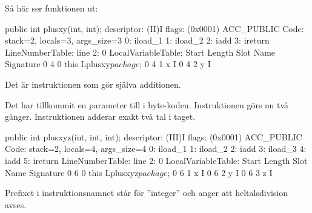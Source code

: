 \SubtaskSolved Så här ser funktionen  ut:
\begin{REPL}
public int plusxy(int, int);
  descriptor: (II)I
  flags: (0x0001) ACC_PUBLIC
  Code:
    stack=2, locals=3, args_size=3
       0: iload_1
       1: iload_2
       2: iadd
       3: ireturn
    LineNumberTable:
      line 2: 0
    LocalVariableTable:
      Start  Length  Slot  Name   Signature
          0       4     0  this   Lplusxy$package$;
          0       4     1     x   I
          0       4     2     y   I
\end{REPL}
Det är instruktionen  som gör själva additionen.


\SubtaskSolved Det har tillkommit en parameter till i byte-koden. Instruktionen  görs nu två gånger. Instruktionen  adderar exakt två tal i taget.

\begin{REPL}
public int plusxyz(int, int, int);
  descriptor: (III)I
  flags: (0x0001) ACC_PUBLIC
  Code:
    stack=2, locals=4, args_size=4
       0: iload_1
       1: iload_2
       2: iadd
       3: iload_3
       4: iadd
       5: ireturn
    LineNumberTable:
      line 2: 0
    LocalVariableTable:
      Start  Length  Slot  Name   Signature
          0       6     0  this   Lplusxyz$package$;
          0       6     1     x   I
          0       6     2     y   I
          0       6     3     z   I
\end{REPL}


\SubtaskSolved Prefixet  i instruktionsnamnet  står för ''integer'' och anger att heltalsdivision avses.

\QUESTEND










